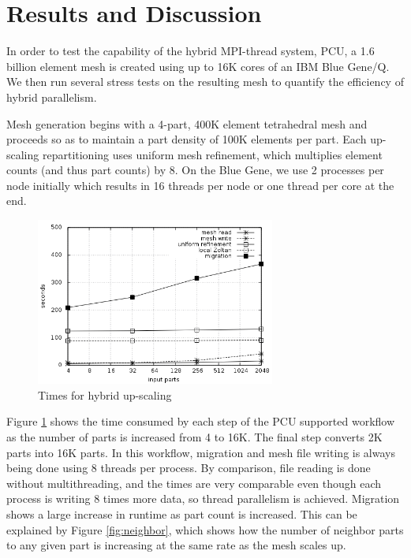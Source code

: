 \documentclass[final,1p,times]{elsarticle}
\begin{document}
\section{Results and Discussion}
\label{sec:results}

In order to test the capability of the hybrid MPI-thread system, PCU,
a 1.6 billion element mesh is created using up to 16K cores of an
IBM Blue Gene/Q.
We then run several stress tests on the resulting mesh to quantify
the efficiency of hybrid parallelism.

Mesh generation begins with a 4-part, 400K element tetrahedral
mesh and proceeds so as to maintain a part density of 100K elements
per part.
Each up-scaling repartitioning uses uniform mesh refinement, which
multiplies element counts (and thus part counts) by 8.
On the Blue Gene, we use 2 processes per node initially which results
in 16 threads per node or one thread per core at the end.

\begin{figure}[!ht]
\begin{center}
\caption{Times for hybrid up-scaling}
\label{fig:scale}
\includegraphics[width=0.7\textwidth]{scaling.png}
\end{center}
\end{figure}

Figure \ref{fig:scale} shows the time consumed by each step of the
PCU supported workflow as the number of parts is increased from 4 to
16K.
The final step converts 2K parts into 16K parts.
In this workflow, migration and mesh file writing is always being
done using 8 threads per process.
By comparison, file reading is done without multithreading,
and the times are very comparable even though each process
is writing 8 times more data, so thread parallelism is achieved.
Migration shows a large increase in runtime as part count is
increased.
This can be explained by Figure \ref{fig:neighbor}, which
shows how the number of neighbor parts to any given part
is increasing at the same rate as the mesh scales up.
\end{document}
